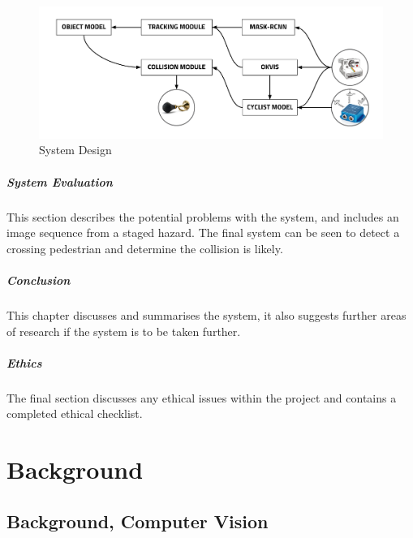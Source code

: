 \documentclass[11pt,twoside]{report}
\begin{document}
\noindent \begin{figure}[h!]
	\includegraphics[width = 1.0\hsize]{figures/software_architecture.png}
	\caption{System Design}
	\label{software_soln1}
\end{figure}


\paragraph{System Evaluation}
This section describes the potential problems with the system, and includes an image sequence from a staged hazard. The final system can be seen to detect a crossing pedestrian and determine the collision is likely.

\paragraph{Conclusion}
This chapter discusses and summarises the system, it also suggests further areas of research if the system is to be taken further.

\paragraph{Ethics}
The final section discusses any ethical issues within the project and contains a completed ethical checklist.


\newpage



\chapter{Background}
\section{Background, Computer Vision}\label{comp_vis_back}
\end{document}
